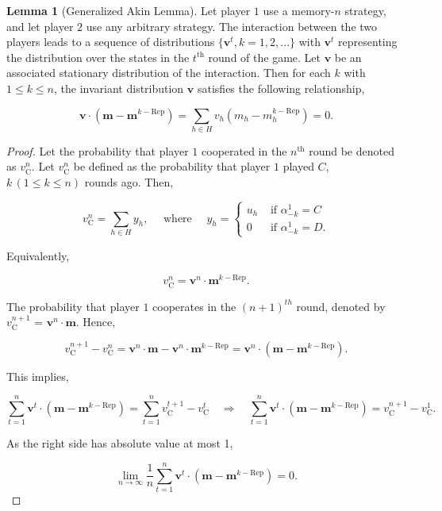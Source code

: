 \documentclass{article}
\theoremstyle{definition}
\newtheorem{lemma}[theorem]{Lemma}
\begin{document}
\begin{lemma}[Generalized Akin Lemma]\label{lemma:AkinGeneralised}
Let player $1$ use a memory-$n$ strategy, and let player $2$ use any arbitrary
strategy. The interaction between the two players leads to a sequence of
distributions \(\{\mathbf{v}^{t}, k = 1, 2, ...\}\) with \(\mathbf{v}^{t}\)
representing the distribution over the states in the \(t^{\text{th}}\) round of
the game. Let $\mathbf{v}$ be an associated stationary distribution of the
interaction.
Then for each $k$ with $1\!\le\!k\!\le\!n$, the invariant distribution $\mathbf{v}$
satisfies the following relationship,

\begin{equation} \label{Eq:AkinsLemma}
\mathbf{v} \cdot (\mathbf{m}-\mathbf{m}^{k-\text{Rep}}) \!=\! \sum_{h\in H} v_h (m_h-m_h^{k-\text{Rep}}) = 0.
\end{equation}

\end{lemma}

\begin{proof}
Let the probability that player $1$ cooperated in the \(n^{\text{th}}\) round be
denoted as \(v_{\text{C}}^{n}\). Let \(v_{\text{C}}^{n}\) be defined as the
probability that player $1$ played \(C\), \(k \, (1\leq k\leq n)\) rounds ago. Then,

$$
v_{\text{C}}^{n} = \sum_{h \in H} y_{h}, \quad \text{ where } \quad y_h = 
\begin{cases}
 u_{h} & \text{ if } \alpha^1_{-k} = C \\
     0 & \text{ if } \alpha^1_{-k} = D.
\end{cases}
$$

Equivalently,

$$
v_{\text{C}}^{n} = \mathbf{v}^{n} \cdot \mathbf{m}^{k - \text{Rep}}.
$$

The probability that player $1$ cooperates in the \((n + 1)^{th}\) round,
denoted by \(v_{\text{C}}^{n + 1}\) = \(\mathbf{v}^{n} \cdot \mathbf{m}\). Hence,

\begin{equation*}
  v_{\text{C}}^{n + 1} - v_{\text{C}}^{n} = \mathbf{v}^{n} \cdot \mathbf{m} - \mathbf{v}^n \cdot \mathbf{m}^{k - \text{Rep}}
  =  \mathbf{v}^{n} \cdot (\mathbf{m} - \mathbf{m}^{k - \text{Rep}}).
\end{equation*}

This implies,

\begin{equation}
\sum^{n}_{t=1} \mathbf{v}^{t} \cdot (\mathbf{m} - \mathbf{m}^{k - \text{Rep}}) = \sum^{n}_{t=1} v_{\text{C}}^{t + 1} - v_{\text{C}}^{t} \quad \Rightarrow \quad \sum^{n}_{t=1} \mathbf{v}^{t} \cdot (\mathbf{m} - \mathbf{m}^{k - \text{Rep}}) =  v_{\text{C}}^{n + 1} - v_{\text{C}}^{1}.
\end{equation}

As the right side has absolute value at most 1,

\begin{equation}
\lim_{n \rightarrow \infty} \frac{1}{n} \sum^{n}_{t=1} \mathbf{v}^{t} \cdot (\mathbf{m} - \mathbf{m}^{k - \text{Rep}}) = 0.
\end{equation}
\end{proof}
\end{document}
